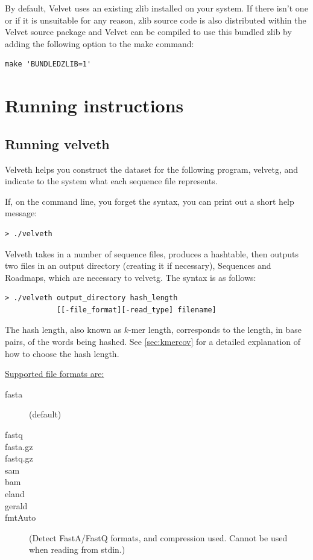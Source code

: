 \documentclass{article}
\begin{document}
By default, Velvet uses an existing zlib installed on your system. If there isn't one or if it is unsuitable for any reason, zlib source code is also distributed within the Velvet source package and Velvet can be compiled to use this bundled zlib by adding the following option to the make command:

\begin{verbatim}
make 'BUNDLEDZLIB=1'
\end{verbatim}

\section{Running instructions}

\subsection{Running velveth}

Velveth helps you construct the dataset for the following program, velvetg, and indicate to the system what  each sequence file represents.

If, on the command line, you forget the syntax, you can print out a short help message:
\begin{verbatim}
> ./velveth
\end{verbatim}

\label{sec:hashing}

Velveth takes in a number of sequence files, produces a hashtable, then outputs two files in an output directory (creating it if necessary), Sequences and Roadmaps, which are necessary to velvetg. The syntax is as follows:

\begin{verbatim}
> ./velveth output_directory hash_length 
            [[-file_format][-read_type] filename]
\end{verbatim}

The hash length, also known as $k$-mer length, corresponds to the length, in base pairs, of the words being hashed. See \ref{sec:kmercov} for a detailed explanation of how to choose the hash length.

\underline{Supported file formats are:}
\begin{description}
\item[fasta] (default) 
\item[fastq]
\item[fasta.gz]
\item[fastq.gz]
\item[sam]
\item[bam]
\item[eland]
\item[gerald]
\item[fmtAuto] (Detect FastA/FastQ formats, and compression used.  Cannot be used when reading from stdin.)
\end{description}
\end{document}
